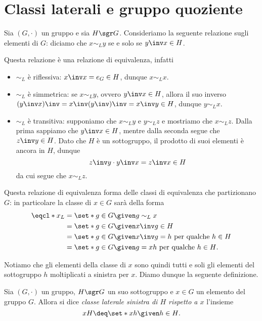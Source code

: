 \section{Classi laterali e gruppo quoziente}

Sia $(G, \cdot)$ un gruppo e sia $H \sgr G$. Consideriamo la seguente relazione sugli elementi di $G$: diciamo che $x \sim_L y$ se e solo se $y\inv x \in H$.

Questa relazione è una relazione di equivalenza, infatti \begin{itemize}
    \item $\sim_L$ è riflessiva: $x\inv x = e_G \in H$, dunque $x \sim_L x$.
    \item $\sim_L$ è simmetrica: se $x \sim_L y$, ovvero $y\inv x \in H$, allora il suo inverso $(y\inv x)\inv = x\inv (y\inv)\inv = x\inv y \in H$, dunque $y \sim_L x$.
    \item $\sim_L$ è transitiva: supponiamo che $x \sim_L y$ e $y \sim_L z$ e mostriamo che $x \sim_L z$. Dalla prima sappiamo che $y\inv x \in H$, mentre dalla seconda segue che $z\inv y \in H$. Dato che $H$ è un sottogruppo, il prodotto di suoi elementi è ancora in $H$, dunque \[
        z\inv y \cdot y\inv x = z\inv x \in H    
    \] da cui segue che $x \sim_L z$.
\end{itemize}

Questa relazione di equivalenza forma delle classi di equivalenza che partizionano $G$: in particolare la classe di $x \in G$ sarà della forma \begin{align*}
    \eqcl*{x}_L &= \set*{g \in G \given g \sim_L x}\\
    &= \set*{g \in G \given x\inv g \in H}\\
    &= \set*{g \in G \given x\inv g = h \text{ per qualche } h \in H}\\
    &= \set*{g \in G \given g = xh \text{ per qualche } h \in H}.
\end{align*}

Notiamo che gli elementi della classe di $x$ sono quindi tutti e soli gli elementi del sottogruppo $h$ moltiplicati a sinistra per $x$.
Diamo dunque la seguente definizione.
\begin{definition}
    Sia $(G, \cdot)$ un gruppo, $H \sgr G$ un suo sottogruppo e $x \in G$ un elemento del gruppo $G$.
    Allora si dice \emph{classe laterale sinistra di $H$ rispetto a $x$} l'insieme \[
        xH \deq \set*{xh \given h \in H}. 
    \]
\end{definition}

